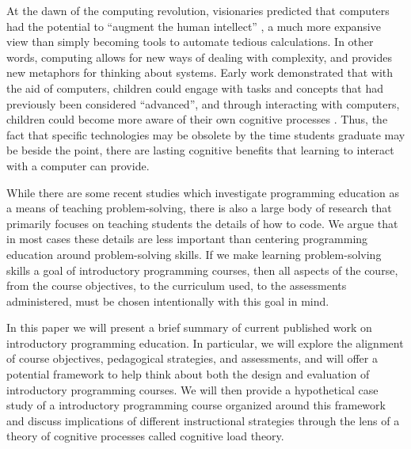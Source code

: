 \documentclass[12pt]{article}
\begin{document}
At the dawn of the computing revolution, visionaries predicted that
computers had the potential to ``augment the human intellect''
\autocite{engelbart_augmenting_1962}, a much more expansive view than
simply becoming tools to automate tedious calculations. In other words, computing allows for new ways of dealing with
complexity, and provides new metaphors for thinking about
systems\autocite{kay_history_1996}. Early work demonstrated that with
the aid of computers, children could engage with tasks and concepts
that had previously been considered ``advanced'', and through
interacting with computers, children could become more aware of their
own cognitive processes \autocite{papert_mindstorms_1980}. Thus, the
fact that specific technologies may be obsolete by the time students
graduate may be beside the point, there are lasting cognitive benefits
that learning to interact with a computer can provide.

While there are some recent studies which investigate programming
education as a means of teaching problem-solving, there is also a
large body of research that primarily focuses on teaching students the
details of how to code. We argue that in most cases these details are
less important than centering programming education around
problem-solving skills. If we make learning problem-solving skills a
goal of introductory programming courses, then all aspects of the
course, from the course objectives, to the curriculum used, to the
assessments administered, must be chosen intentionally with this goal
in mind. 

In this paper we will present a brief summary of current published
work on introductory programming education. In particular, we will
explore the alignment of course objectives, pedagogical strategies,
and assessments, and will offer a potential framework to help think
about both the design and evaluation of introductory programming
courses. We will then provide a hypothetical case study of a
introductory programming course organized around this framework and
discuss implications of different instructional strategies through the
lens of a theory of cognitive processes called cognitive load theory.


\end{document}
